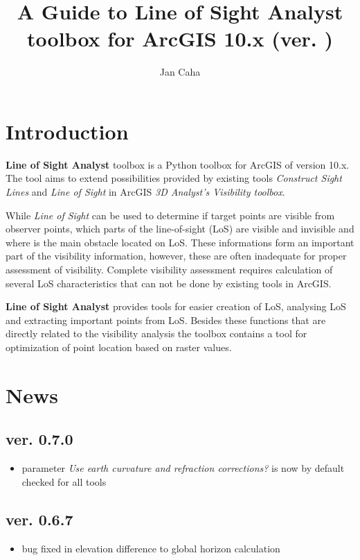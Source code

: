 \documentclass[]{article}
\title{A Guide to \textbf{Line of Sight Analyst} toolbox for ArcGIS 10.x (ver. \currentVersion{})}
\author[*]{Jan Caha}
\affil[*]{email: \textit{jan.caha@outlook.com}}
\begin{document}
\maketitle

\setcounter{tocdepth}{2}
\tableofcontents

\section{Introduction}

\textbf{Line of Sight Analyst} toolbox is a Python toolbox for ArcGIS of version 10.x. The tool aims to extend possibilities provided by existing tools \textit{Construct Sight Lines} and \textit{Line of Sight} in ArcGIS \textit{3D Analyst's Visibility toolbox}.

While \textit{Line of Sight} can be used to determine if target points are visible from observer points, which parts of the line-of-sight (LoS) are visible and invisible and where is the main obstacle located on LoS. These informations form an important part of the visibility information, however, these are often inadequate for proper assessment of visibility. Complete visibility assessment requires calculation of several LoS characteristics that can not be done by existing tools in ArcGIS.

\textbf{Line of Sight Analyst} provides tools for easier creation of LoS, analysing LoS and extracting important points from LoS. Besides these functions that are directly related to the visibility analysis the toolbox contains a tool for optimization of point location based on raster values.

\section{News}

\subsection*{ver. 0.7.0}
\begin{itemize}
	\item parameter \emph{Use earth curvature and refraction corrections?} is now by default checked for all tools
\end{itemize}

\subsection*{ver. 0.6.7}
\begin{itemize}
	\item bug fixed in elevation difference to global horizon calculation
\end{itemize}
\end{document}
